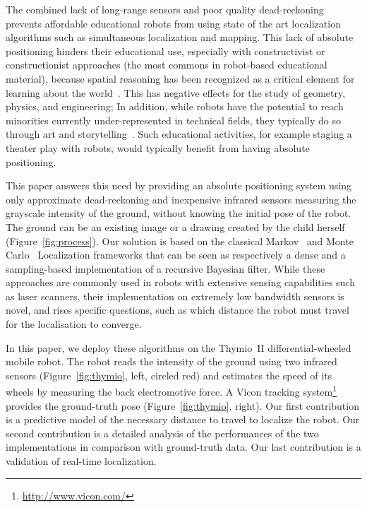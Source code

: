 \documentclass[letterpaper, 10pt, conference]{ieeeconf}
\newcommand{\fig}[1]{Figure~\ref{fig:#1}}
\begin{document}
The combined lack of long-range sensors and poor quality dead-reckoning prevents affordable educational robots from using state of the art localization algorithms such as simultaneous localization and mapping.
This lack of absolute positioning hinders their educational use, especially with constructivist or constructionist approaches (the most commons in robot-based educational material), because spatial reasoning has been recognized as a critical element for learning about the world~\cite{lesh2003beyond}.
This has negative effects for the study of geometry, physics, and engineering;
In addition, while robots have the potential to reach minorities currently under-represented in technical fields, they typically do so through art and storytelling~\cite{szecsei2015girls}.
Such educational activities, for example staging a theater play with robots, would typically benefit from having absolute positioning.

This paper answers this need by providing an absolute positioning system using only approximate dead-reckoning and inexpensive infrared sensors measuring the grayscale intensity of the ground, without knowing the initial pose of the robot.
The ground can be an existing image or a drawing created by the child herself (\fig{process}).
Our solution is based on the classical Markov~\cite{fox1999markov} and Monte Carlo~\cite{dellaert1999monte} Localization frameworks that can be seen as respectively a dense and a sampling-based implementation of a recursive Bayesian filter.
While these approaches are commonly used in robots with extensive sensing capabilities such as laser scanners, their implementation on extremely low bandwidth sensors is novel, and rises specific questions, such as which distance the robot must travel for the localisation to converge.

In this paper, we deploy these algorithms on the Thymio~II differential-wheeled mobile robot.
The robot reads the intensity of the ground using two infrared sensors (\fig{thymio}, left, circled red) and estimates the speed of its wheels by measuring the back electromotive force.
A Vicon tracking system\footnote{\url{http://www.vicon.com/}} provides the ground-truth pose (\fig{thymio}, right).
Our first contribution is a predictive model of the necessary distance to travel to localize the robot.
Our second contribution is a detailed analysis of the performances of the two implementations in comparison with ground-truth data.
Our last contribution is a validation of real-time localization.
\end{document}

